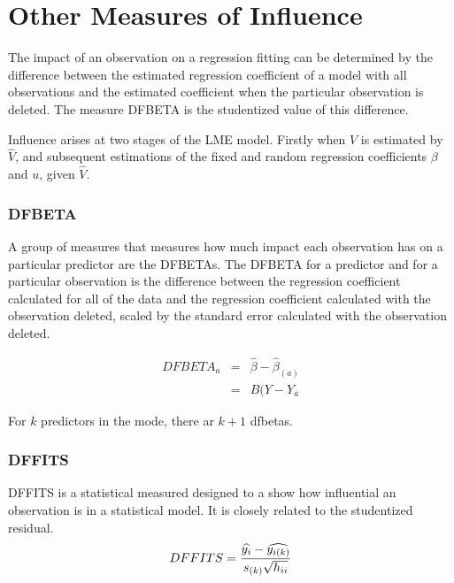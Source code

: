 \documentclass[residuals.tex]{subfiles}
\begin{document}
	
\section{Other Measures of Influence}
The impact of an observation on a regression fitting can be determined by the difference between the estimated regression coefficient of a model with all observations and the estimated coefficient when the particular observation is deleted. The measure DFBETA is the studentized value of this difference.

Influence arises at two stages of the LME model. Firstly when $V$ is estimated by $\hat{V}$, and subsequent
estimations of the fixed and random regression coefficients $\beta$ and $u$, given $\hat{V}$.



\subsubsection{DFBETA}
A group of measures that measures how much impact each observation has on a particular predictor are the DFBETAs. The DFBETA for a predictor and for a particular observation is the difference between the regression coefficient calculated for all of the data and the regression coefficient calculated with the observation deleted,  scaled by the standard error calculated with the observation deleted.

\begin{eqnarray}
DFBETA_{a} &=& \hat{\beta} - \hat{\beta}_{(a)} \\
&=& B(Y-Y_{\bar{a}}
\end{eqnarray}

For $k$ predictors in the mode, there ar $k+1$ dfbetas.



\subsubsection{DFFITS} %
DFFITS is a statistical measured designed to a show how influential an observation is in a statistical model. It is closely related to the studentized residual.
\begin{displaymath} DFFITS = {\widehat{y_i} -
	\widehat{y_{i(k)}} \over s_{(k)} \sqrt{h_{ii}}} \end{displaymath}
\end{document}
